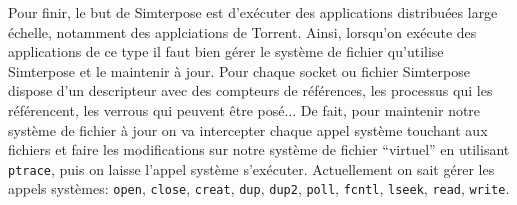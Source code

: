 Pour finir, le but de Simterpose est d'exécuter des applications distribuées large échelle, notamment des applciations de Torrent. Ainsi, lorsqu'on exécute des applications de ce type il faut bien gérer le système de fichier qu'utilise Simterpose et le maintenir à jour. Pour chaque socket ou fichier Simterpose dispose d'un descripteur avec des compteurs de références, les processus qui les référencent, les verrous qui peuvent être posé... De fait, pour maintenir notre système de fichier à jour on va intercepter chaque appel système touchant aux fichiers et faire les modifications sur notre système de fichier ``virtuel'' en utilisant \texttt{ptrace}, puis on laisse l'appel système s'exécuter. Actuellement on sait gérer les appels systèmes: \texttt{open},  \texttt{close}, \texttt{creat}, \texttt{dup}, \texttt{dup2}, \texttt{poll}, \texttt{fcntl}, \texttt{lseek}, \texttt{read}, \texttt{write}.
